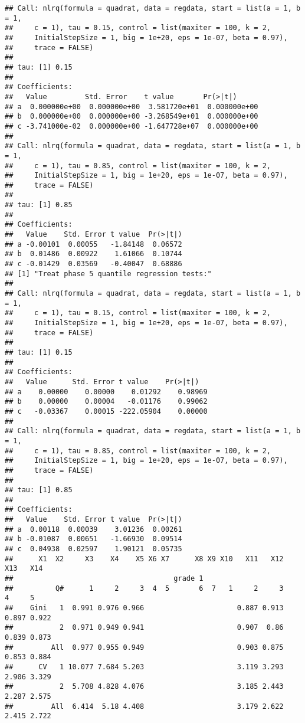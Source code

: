 \documentclass[
]{article}
\begin{document}
\begin{verbatim}
## Call: nlrq(formula = quadrat, data = regdata, start = list(a = 1, b = 1, 
##     c = 1), tau = 0.15, control = list(maxiter = 100, k = 2, 
##     InitialStepSize = 1, big = 1e+20, eps = 1e-07, beta = 0.97), 
##     trace = FALSE)
## 
## tau: [1] 0.15
## 
## Coefficients:
##   Value         Std. Error    t value       Pr(>|t|)     
## a  0.000000e+00  0.000000e+00  3.581720e+01  0.000000e+00
## b  0.000000e+00  0.000000e+00 -3.268549e+01  0.000000e+00
## c -3.741000e-02  0.000000e+00 -1.647728e+07  0.000000e+00
## 
## Call: nlrq(formula = quadrat, data = regdata, start = list(a = 1, b = 1, 
##     c = 1), tau = 0.85, control = list(maxiter = 100, k = 2, 
##     InitialStepSize = 1, big = 1e+20, eps = 1e-07, beta = 0.97), 
##     trace = FALSE)
## 
## tau: [1] 0.85
## 
## Coefficients:
##   Value    Std. Error t value  Pr(>|t|)
## a -0.00101  0.00055   -1.84148  0.06572
## b  0.01486  0.00922    1.61066  0.10744
## c -0.01429  0.03569   -0.40047  0.68886
## [1] "Treat phase 5 quantile regression tests:"
## 
## Call: nlrq(formula = quadrat, data = regdata, start = list(a = 1, b = 1, 
##     c = 1), tau = 0.15, control = list(maxiter = 100, k = 2, 
##     InitialStepSize = 1, big = 1e+20, eps = 1e-07, beta = 0.97), 
##     trace = FALSE)
## 
## tau: [1] 0.15
## 
## Coefficients:
##   Value      Std. Error t value    Pr(>|t|)  
## a    0.00000    0.00000    0.01292    0.98969
## b    0.00000    0.00004   -0.01176    0.99062
## c   -0.03367    0.00015 -222.05904    0.00000
## 
## Call: nlrq(formula = quadrat, data = regdata, start = list(a = 1, b = 1, 
##     c = 1), tau = 0.85, control = list(maxiter = 100, k = 2, 
##     InitialStepSize = 1, big = 1e+20, eps = 1e-07, beta = 0.97), 
##     trace = FALSE)
## 
## tau: [1] 0.85
## 
## Coefficients:
##   Value    Std. Error t value  Pr(>|t|)
## a  0.00118  0.00039    3.01236  0.00261
## b -0.01087  0.00651   -1.66930  0.09514
## c  0.04938  0.02597    1.90121  0.05735
##      X1  X2     X3    X4    X5 X6 X7      X8 X9 X10   X11   X12   X13   X14
##                                      grade 1                               
##          Q#      1     2     3  4  5       6  7   1     2     3     4     5
##    Gini   1  0.991 0.976 0.966                      0.887 0.913 0.897 0.922
##           2  0.971 0.949 0.941                      0.907  0.86 0.839 0.873
##         All  0.977 0.955 0.949                      0.903 0.875 0.853 0.884
##      CV   1 10.077 7.684 5.203                      3.119 3.293 2.906 3.329
##           2  5.708 4.828 4.076                      3.185 2.443 2.287 2.575
##         All  6.414  5.18 4.408                      3.179 2.622 2.415 2.722

\end{verbatim}
\end{document}
